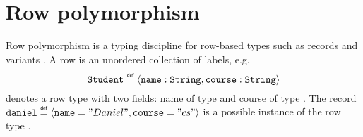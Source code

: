 \section{Row polymorphism}\label{sec:rowpolymorphism}
Row polymorphism is a typing discipline for row-based types such as records and variants \cite{Remy1993}. A row is an unordered collection of labels, e.g. 
\[ \type{Student} \defas \record{\code{name}:\type{String},\code{course}:\type{String}} \]
denotes a row type with two fields: name of type  and course of type . The record $\code{daniel} \defas \record{\code{name}="Daniel", \code{course}="cs"}$ is a possible instance of the row type . 

